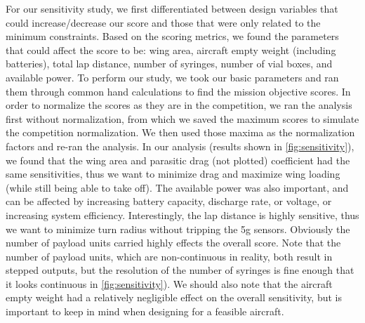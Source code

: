 For our sensitivity study, we first differentiated between design variables that could increase/decrease our score and those that were only related to the minimum constraints. Based on the scoring metrics, we found the parameters that could affect the score to be: wing area, aircraft empty weight (including batteries), total lap distance, number of syringes, number of vial boxes, and available power.  To perform our study, we took our basic parameters and ran them through common hand calculations to find the mission objective scores. In order to normalize the scores as they are in the competition, we ran the analysis first without normalization, from which we saved the maximum scores to simulate the competition normalization. We then used those maxima as the normalization factors and re-ran the analysis.  In our analysis (results shown in \cref{fig:sensitivity}), we found that the wing area and parasitic drag (not plotted) coefficient had the same sensitivities, thus we want to minimize drag and maximize wing loading (while still being able to take off).  The available power was also important, and can be affected by increasing battery capacity, discharge rate, or voltage, or increasing system efficiency. Interestingly, the lap distance is highly sensitive, thus we want to minimize turn radius without tripping the 5g sensors. Obviously the number of payload units carried highly effects the overall score. Note that the number of payload units, which are non-continuous in reality, both result in stepped outputs, but the resolution of the number of syringes is fine enough that it looks continuous in \cref{fig:sensitivity}). We should also note that the aircraft empty weight had a relatively negligible effect on the overall sensitivity, but is important to keep in mind when designing for a feasible aircraft.